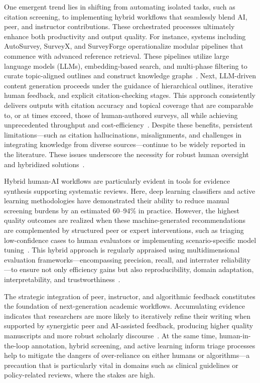 \documentclass[11pt]{article}
\begin{document}
One emergent trend lies in shifting from automating isolated tasks, such as citation screening, to implementing hybrid workflows that seamlessly blend AI, peer, and instructor contributions. These orchestrated processes ultimately enhance both productivity and output quality. For instance, systems including AutoSurvey, SurveyX, and SurveyForge operationalize modular pipelines that commence with advanced reference retrieval. These pipelines utilize large language models (LLMs), embedding-based search, and multi-phase filtering to curate topic-aligned outlines and construct knowledge graphs~\cite{10,12,35,76}. Next, LLM-driven content generation proceeds under the guidance of hierarchical outlines, iterative human feedback, and explicit citation-checking stages. This approach consistently delivers outputs with citation accuracy and topical coverage that are comparable to, or at times exceed, those of human-authored surveys, all while achieving unprecedented throughput and cost-efficiency~\cite{10,12,29,35,46,51}. Despite these benefits, persistent limitations—such as citation hallucinations, misalignments, and challenges in integrating knowledge from diverse sources—continue to be widely reported in the literature. These issues underscore the necessity for robust human oversight and hybridized solutions~\cite{10,11,35,39,46,47,51,62}.

Hybrid human-AI workflows are particularly evident in tools for evidence synthesis supporting systematic reviews. Here, deep learning classifiers and active learning methodologies have demonstrated their ability to reduce manual screening burdens by an estimated 60--94\% in practice. However, the highest quality outcomes are realized when these machine-generated recommendations are complemented by structured peer or expert interventions, such as triaging low-confidence cases to human evaluators or implementing scenario-specific model tuning~\cite{28,29,30,37,39,49,80,86,88,89,91,92,94,96,98,107,108}. This hybrid approach is regularly appraised using multidimensional evaluation frameworks—encompassing precision, recall, and interrater reliability—to ensure not only efficiency gains but also reproducibility, domain adaptation, interpretability, and trustworthiness~\cite{28,29,31,38,39,49,62,76,80,88,89,90,91,94,96,97,98,108}.

The strategic integration of peer, instructor, and algorithmic feedback constitutes the foundation of next-generation academic workflows. Accumulating evidence indicates that researchers are more likely to iteratively refine their writing when supported by synergistic peer and AI-assisted feedback, producing higher quality manuscripts and more robust scholarly discourse~\cite{88,89,91,92,96,98,107,108}. At the same time, human-in-the-loop annotation, hybrid screening, and active learning inform triage processes help to mitigate the dangers of over-reliance on either humans or algorithms—a precaution that is particularly vital in domains such as clinical guidelines or policy-related reviews, where the stakes are high.
\end{document}
